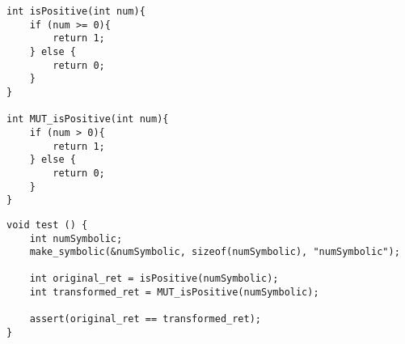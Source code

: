 
\begin{lstlisting}[style=CStyle, caption=isPositive and MUT\_isPositive functions, label=function]
int isPositive(int num){
	if (num >= 0){
		return 1;
	} else {
		return 0;
	}
}

int MUT_isPositive(int num){
	if (num > 0){
		return 1;
	} else {
		return 0;
	}
}

\end{lstlisting}

\begin{lstlisting}[style=CStyle, caption=Holling's approach for test case generation., label=example]
void test () { 
	int numSymbolic; 
	make_symbolic(&numSymbolic, sizeof(numSymbolic), "numSymbolic"); 
 	
 	int original_ret = isPositive(numSymbolic); 
	int transformed_ret = MUT_isPositive(numSymbolic); 
 
	assert(original_ret == transformed_ret); 
}
\end{lstlisting}

%
% 	
%	
